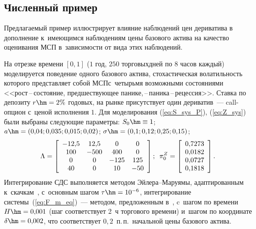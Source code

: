 \begin{multicols}{2}
\vspace*{-14pt}

\section{Численный пример}

\vspace*{-2pt}

Предлагаемый пример иллюстрирует влияние наблюдений цен дериватива
в дополнение к~име\-ющим\-ся наблюдениям цены базового актива
на качество оценивания МСП в~зависимости от вида этих наблюдений.

На отрезке времени $[0,1]$ ($1$ год, $250$ торговых\linebreak дней по $8$ часов каждый) 
моделируется поведение одного базового актива, стохастическая волатильность 
которого представляет собой МСП\linebreak с~четырьмя возможными состояниями <<рост\,--\,со\-сто\-яние, предшествующее панике,\,--\,па\-ни\-ка\,--\,ре\-цес\-сия>>.
Ставка по депозиту $r \hm= 2 \%$ годовых, на рынке присутствует один дериватив~--- 
{call}-оп\-ци\-он с~ценой исполнения $1$. Для моделирования (\ref{eq:S_sys_P}), (\ref{eq:Z_sys}) были выбраны следующие параметры:
$
S_0 \hm\equiv 1$; $a \hm= (0{,}04; 0{,}035;0{,}015;0{,}02)$; $\sigma \hm= (0{,}1;0{,}12;0{,}25;0{,}15)$;
$$
\Lambda =
\left[
\begin{array}{cccc}
-12{,}5 & 12{,}5 & 0 & 0 \\
100 & -500 & 400 & 0 \\
0 & 0 & -125 & 125 \\
40 & 0 & 10 & -50 \\
\end{array}
\right]; \enskip
\pi_0^Z =
\left[
\begin{array}{c}
0{,}7273  \\
0{,}0182  \\
0{,}0727  \\
0{,}1818  \\
\end{array}
\right].
$$
Интегрирование СДС выполняется методом Эй\-ле\-ра--Ма\-ру\-ямы, адаптированным к~скачкам~\cite{PB_10}, с~основным шагом $\tau\hm = 10^{-6}$,
интегрирование сис\-те\-мы~(\ref{eq:F_m_eq})~--- методом, предложенным в~\cite{B_23_2_IA},
 c~шагом по времени $H \hm= 0{,}001$ (шаг соответствует 2~ч торгового времени) 
 и~шагом по координате $\delta \hm= 0{,}002$, что соответствует $0{,}2$~п.\,п.\ начальной цены базового актива.


\end{multicols}
